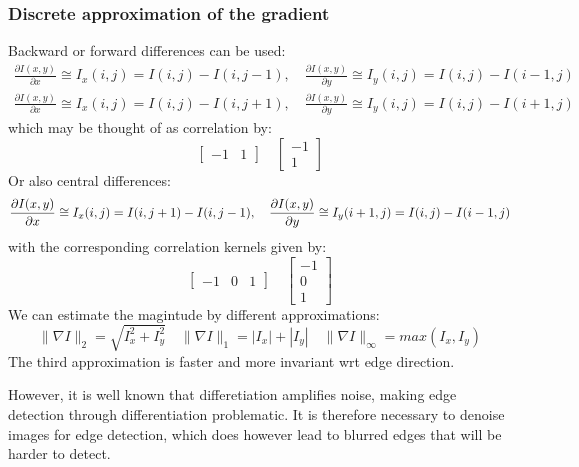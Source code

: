 \documentclass{article}
\begin{document}
\subsubsection{Discrete approximation of the gradient}
Backward or forward differences can be used:
\begin{gather*}
    \displaystyle\frac{\partial I(x,y)}{\partial x} \cong I_x(i,j)=I(i,j)-I(i,j-1), \quad     \displaystyle\frac{\partial I(x,y)}{\partial y} \cong I_y(i,j)=I(i,j)-I(i-1,j)\\
    \displaystyle\frac{\partial I(x,y)}{\partial x} \cong I_x(i,j)=I(i,j)-I(i,j+1), \quad     \displaystyle\frac{\partial I(x,y)}{\partial y} \cong I_y(i,j)=I(i,j)-I(i+1,j)
\end{gather*}
which may be thought of as correlation by:
\[
    \begin{bmatrix}
        -1 & 1
    \end{bmatrix}\quad
    \begin{bmatrix}
        -1 \\ 1
    \end{bmatrix}
\]
Or also central differences:
\[
    \displaystyle\frac{\partial I(x,y)}{\partial x} \cong I_x(i,j)=I(i,j+1)-I(i,j-1), \quad     \displaystyle\frac{\partial I(x,y)}{\partial y} \cong I_y(i+1,j)=I(i,j)-I(i-1,j)\\
\]
with the corresponding correlation kernels given by:
\[
    \begin{bmatrix}
        -1 & 0 & 1
    \end{bmatrix}\quad
    \begin{bmatrix}
        -1 \\ 0 \\ 1
    \end{bmatrix}
\]
We can estimate the magintude by different approximations:
\[
    \|\nabla I\|_2=\sqrt{I_x^2+I_y^2} \quad \|\nabla I \|_1 = |I_x| + |I_y| \quad \|\nabla I \|_\infty = max(I_x,I_y)
\]
The third approximation is faster and more invariant wrt edge direction. 

However, it is well known that differetiation amplifies noise, making edge detection through differentiation problematic. It is therefore necessary to denoise images for edge detection, which does however lead to blurred edges that will be harder to detect. 
\end{document}
